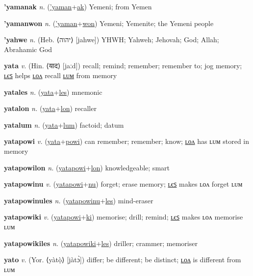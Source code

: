 \textbf{\hypertarget{'yamanak}{'yamanak}} \textit{n.} (\hyperlink{'yaman}{'yaman}+\allowbreak \hyperlink{ak}{ak})
Yemeni; from Yemen

\textbf{\hypertarget{'yamanwon}{'yamanwon}} \textit{n.} (\hyperlink{'yaman}{'yaman}+\allowbreak \hyperlink{won}{won})
Yemeni; Yemenite; the Yemeni people

\textbf{\hypertarget{'yahwe}{'yahwe}} \textit{n.} (Heb. ⟨{\hebrew{}יהוה‬}⟩ [jahwe])
YHWH; Yahweh; Jehovah; God; Allah; Abrahamic God

\textbf{\hypertarget{yata}{yata}} \textit{v.} (Hin. ⟨{\devanagari{}याद}⟩ [jaːd])
recall; remind; remember; remember to; jog memory; \hyperlink{yatales}{ʟєꜱ} helps \hyperlink{yatalon}{ʟᴏᴧ} recall \hyperlink{yatalum}{ʟᴜᴍ} from memory

\textbf{\hypertarget{yatales}{yatales}} \textit{n.} (\hyperlink{yata}{yata}+\allowbreak \hyperlink{les}{les})
mnemonic

\textbf{\hypertarget{yatalon}{yatalon}} \textit{n.} (\hyperlink{yata}{yata}+\allowbreak \hyperlink{lon}{lon})
recaller

\textbf{\hypertarget{yatalum}{yatalum}} \textit{n.} (\hyperlink{yata}{yata}+\allowbreak \hyperlink{lum}{lum})
factoid; datum

\textbf{\hypertarget{yatapowi}{yatapowi}} \textit{v.} (\hyperlink{yata}{yata}+\allowbreak \hyperlink{powi}{powi})
can remember; remember; know; \hyperlink{yatapowilon}{ʟᴏᴧ} has ʟᴜᴍ stored in memory

\textbf{\hypertarget{yatapowilon}{yatapowilon}} \textit{n.} (\hyperlink{yatapowi}{yatapowi}+\allowbreak \hyperlink{lon}{lon})
knowledgeable; smart

\textbf{\hypertarget{yatapowinu}{yatapowinu}} \textit{v.} (\hyperlink{yatapowi}{yatapowi}+\allowbreak \hyperlink{nu}{nu})
forget; erase memory; \hyperlink{yatapowinules}{ʟєꜱ} makes ʟᴏᴧ forget ʟᴜᴍ

\textbf{\hypertarget{yatapowinules}{yatapowinules}} \textit{n.} (\hyperlink{yatapowinu}{yatapowinu}+\allowbreak \hyperlink{les}{les})
mind-eraser

\textbf{\hypertarget{yatapowiki}{yatapowiki}} \textit{v.} (\hyperlink{yatapowi}{yatapowi}+\allowbreak \hyperlink{ki}{ki})
memorise; drill; remind; \hyperlink{yatapowikiles}{ʟєꜱ} makes ʟᴏᴧ memorise ʟᴜᴍ

\textbf{\hypertarget{yatapowikiles}{yatapowikiles}} \textit{n.} (\hyperlink{yatapowiki}{yatapowiki}+\allowbreak \hyperlink{les}{les})
driller; crammer; memoriser

\textbf{\hypertarget{yato}{yato}} \textit{v.} (Yor. ⟨yàtọ̀⟩ [jàtɔ̀])
differ; be different; be distinct; \hyperlink{yatolon}{ʟᴏᴧ} is different from ʟᴜᴍ

